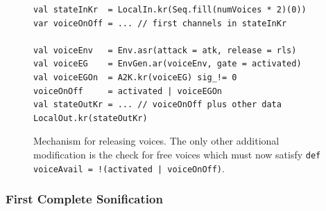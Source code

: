 \documentclass[11pt,a4paper]{article}
\begin{document}
\begin{figure}
\begin{lstlisting}[style=scala]
val stateInKr  = LocalIn.kr(Seq.fill(numVoices * 2)(0))
var voiceOnOff = ... // first channels in stateInKr

val voiceEnv   = Env.asr(attack = atk, release = rls)
val voiceEG    = EnvGen.ar(voiceEnv, gate = activated)
val voiceEGOn  = A2K.kr(voiceEG) sig_!= 0
voiceOnOff     = activated | voiceEGOn
val stateOutKr = ... // voiceOnOff plus other data
LocalOut.kr(stateOutKr)
\end{lstlisting}
\caption{Mechanism for releasing voices. The only other additional modification is the check for free voices which must now satisfy \texttt{def voiceAvail = !(activated | voiceOnOff)}.}
\label{fig:voices-release}
\end{figure}

\subsubsection*{First Complete Sonification}
\end{document}
